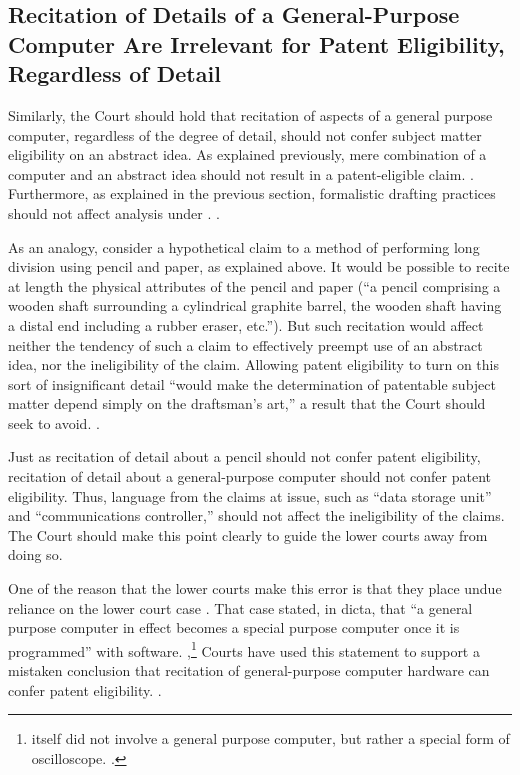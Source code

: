 \documentclass{scotus}
\begin{document}
%
%
\subsection{Recitation of Details of a General-Purpose Computer Are Irrelevant
for Patent Eligibility, Regardless of Detail}

Similarly, the Court should hold that recitation of aspects of a general purpose
computer, regardless of the degree of detail, should not confer subject matter
eligibility on an abstract idea. As explained previously, mere combination of a
computer and an abstract idea should not result in a patent-eligible claim.
. Furthermore, as explained in the previous section,
formalistic drafting practices should not affect analysis under .
.

As an analogy, consider a hypothetical claim to a method of performing long
division using pencil and paper, as explained above. It would be possible to
recite at length the physical attributes of the pencil and paper (``a pencil
comprising a wooden shaft surrounding a cylindrical graphite barrel, the wooden
shaft having a distal end including a rubber eraser, etc.''). But such
recitation would affect neither the tendency of such a claim to effectively
preempt use of an abstract idea, nor the ineligibility of the claim. Allowing
patent eligibility to turn on this sort of insignificant detail ``would make the
determination of patentable subject matter depend simply on the draftsman's
art,'' a result that the Court should seek to avoid. .

Just as recitation of detail about a pencil should not confer patent
eligibility, recitation of detail about a general-purpose computer should not
confer patent eligibility. Thus, language from the claims at issue, such as
``data storage unit'' and ``communications controller,'' should not affect the
ineligibility of the claims. The Court should make this point clearly to guide
the lower courts away from doing so.

One of the reason that the lower courts make this error is that they place undue
reliance on the lower court case . That case stated, in dicta,
that ``a general purpose computer in effect becomes a special purpose computer
once it is programmed'' with software. ,\footnote{ itself did not involve a general purpose
computer, but rather a special form of oscilloscope. .}
Courts have used this statement to support a mistaken conclusion that recitation
of general-purpose computer hardware can confer patent eligibility.
.
\end{document}
